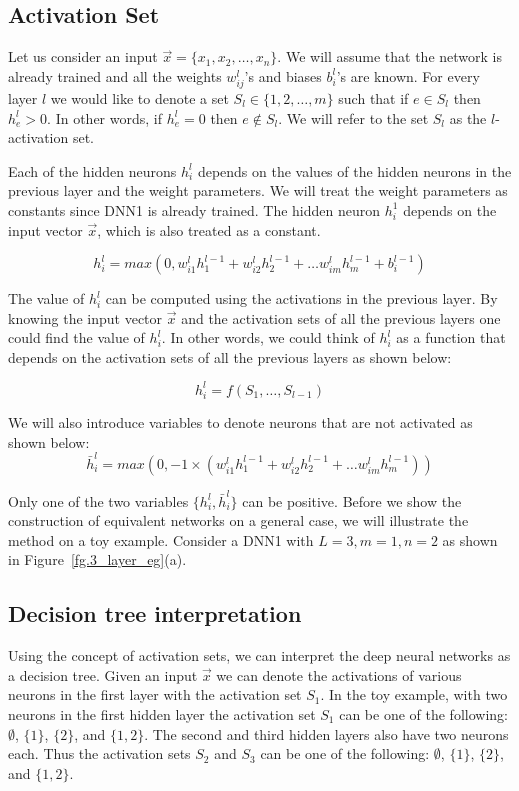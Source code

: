 \documentclass[runningheads,a4paper]{llncs}
\begin{document}
\subsection{Activation Set}
Let us consider an input $\vec{x} = \{x_1,x_2,\dots,x_n\}$. We will assume that the network is already trained and all the weights $w^l_{ij}$'s and biases $b^l_i$'s are known. For every layer $l$ we would like to denote a set $S_l \in \{1,2,\dots,m\}$ such that if $e \in S_l$ then $h^l_e > 0$. In other words, if $h^l_e = 0$ then $e \not\in S_l$. We will refer to the set $S_l$ as the $l$-activation set. 

Each of the hidden neurons $h^l_i$ depends on the values of the hidden neurons in the previous layer and the weight parameters. We will treat the weight parameters as constants since {\sc DNN1} is already trained. The hidden neuron $h^1_i$ depends on the input vector $\vec{x}$, which is also treated as a constant.

\begin{equation*}
h^l_i  =  max(0,w^{l}_{i1} h^{l-1}_1 + w^{l}_{i2} h^{l-1}_2 + \dots w^{l}_{im} h^{l-1}_m+b^{l-1}_i) 
\end{equation*}

The value of $h^l_i$ can be computed using the activations in the previous layer. By knowing the input vector $\vec{x}$ and the activation sets of all the previous layers one could find the value of $h^l_i$. In other words, we could think of $h^l_i$ as a function that depends on the activation sets of all the previous layers as shown below:

\begin{equation*}
h^l_i  =  f(S_1,\dots,S_{l-1})
\end{equation*}

We will also introduce variables to denote neurons that are not activated as shown below:
\begin{equation*}
\bar{h}^l_i  =  max(0,-1\times(w^{l}_{i1} h^{l-1}_1 + w^{l}_{i2} h^{l-1}_2 + \dots w^{l}_{im} h^{l-1}_m)) 
\end{equation*}

Only one of the two variables $\{h^l_i,\bar{h}^l_i\}$ can be positive. Before we show the construction of equivalent networks on a general case, we will illustrate the method on a toy example. Consider a {\sc DNN1} with $L=3,m=1,n=2$ as shown in Figure~\ref{fg.3_layer_eg}(a).

\subsection{Decision tree interpretation}
Using the concept of activation sets, we can interpret the deep neural networks as a decision tree. Given an input $\vec{x}$ we can denote the activations of various neurons in the first layer with the activation set $S_1$. In the toy example, with two neurons in the first hidden layer the activation set $S_1$ can be one of the following: $\emptyset$, $\{1\}$, $\{2\}$, and $\{1,2\}$. The second and third hidden layers also have two neurons each. Thus the activation sets $S_2$ and $S_3$ can be one of the following: $\emptyset$, $\{1\}$, $\{2\}$, and $\{1,2\}$.
\end{document}
